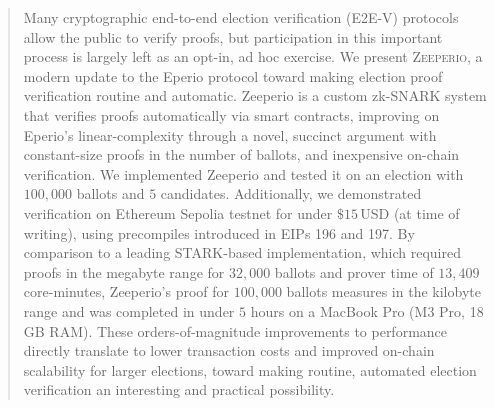 \begin{abstract}

Many cryptographic end-to-end election verification (E2E-V) protocols allow the public to verify proofs, but participation in this important process is largely left as an opt-in, ad hoc exercise. 
We present \textsc{Zeeperio}, a modern update to the Eperio protocol toward making election proof verification routine and automatic. 
Zeeperio is a custom zk-SNARK system that verifies proofs automatically via smart contracts, improving on Eperio's linear-complexity through a novel, succinct argument with constant-size proofs in the number of ballots, and inexpensive on-chain verification.
We implemented Zeeperio and tested it on an election with $100{,}000$ ballots and $5$ candidates. Additionally, we demonstrated verification on Ethereum Sepolia testnet for under $\$15\,$USD (at time of writing), using precompiles introduced in EIPs 196 and 197. 
By comparison to a leading STARK-based implementation, which required proofs in the megabyte range for $32{,}000$ ballots and prover time of $13{,}409$ core-minutes, Zeeperio's proof for $100{,}000$ ballots measures in the kilobyte range and was completed in under $5$ hours on a MacBook Pro (M3 Pro, 18 GB RAM). 
These orders-of-magnitude improvements to performance directly translate to lower transaction costs and improved on-chain scalability for larger elections, toward making routine, automated election verification an interesting and practical possibility.

\end{abstract}